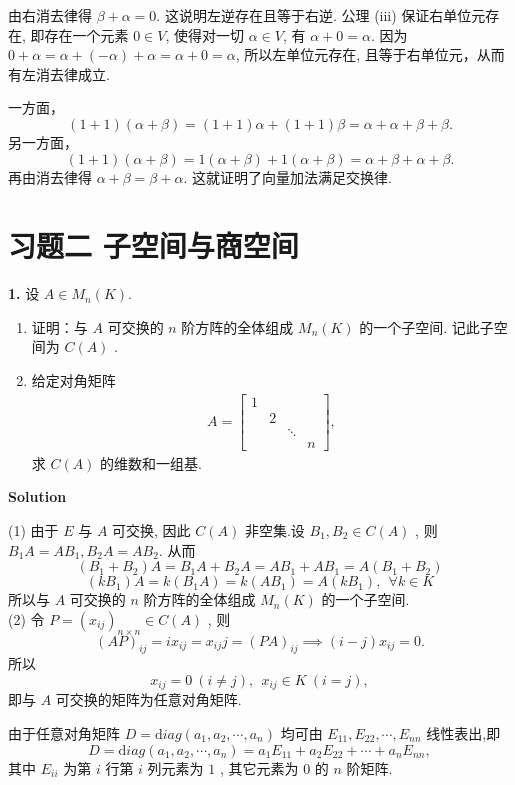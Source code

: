 \documentclass[11pt,a4paper,openany,oneside]{book}
\newcommand{\diag}{\mathrm diag}
\newcommand\Solution{\noindent\textbf{\textsf{Solution}}\par\medskip}
\begin{document}
由右消去律得 $\beta+\alpha=0$. 这说明左逆存在且等于右逆.
公理 (iii) 保证右单位元存在, 即存在一个元素 $0\in V$, 使得对一切
$\alpha\in V$, 有 $\alpha+0=\alpha$. 因为 $0+\alpha=\alpha+(-\alpha)+\alpha=\alpha+0=\alpha$, 所以左单位元存在, 且等于右单位元，从而有左消去律成立.



一方面，
$$
(1+1)(\alpha+\beta)=(1+1)\alpha+(1+1)\beta=\alpha+\alpha+\beta+\beta.
$$
另一方面，
$$
(1+1)(\alpha+\beta)=1(\alpha+\beta)+1(\alpha+\beta)=\alpha+\beta+\alpha+\beta.
$$
再由消去律得 $\alpha+\beta=\beta+\alpha$. 这就证明了向量加法满足交换律.



\section{习题二 \quad 子空间与商空间}

\begin{myexample}
	\textbf{1.} 
设 $ A \in M_n(K) $.
\begin{enumerate}[(1)]
\item 证明：与 $ A $ 可交换的 $ n $ 阶方阵的全体组成 $ M_n(K) $ 的一个子空间. 记此子空间为 $ C(A) $ . 
\item 给定对角矩阵 
\begin{gather*}
A=
\begin{bmatrix} 
1 &    &   &   \\ 
& 2  &   &   \\
&    & \ddots & \\
&    &    &  n  
\end{bmatrix},
\end{gather*}
求 $ C(A) $ 的维数和一组基. 
\end{enumerate}
\end{myexample}
\Solution

(1) 由于 $ E $ 与 $ A $ 可交换, 因此 $ C(A) $ 非空集.设 $ B_1, B_2 \in C(A) $ , 则 $ B_1A = AB_1, B_2A = AB_2 $. 从而
 $$  (B_1+B_2)A = B_1A + B_2A = AB_1 + AB_1 = A(B_1 + B_2)  $$ 
 $$  (kB_1)A = k(B_1A) = k(AB_1) = A(kB_1), \ \ \forall k \in K  $$ 
所以与 $ A $ 可交换的 $ n $ 阶方阵的全体组成 $ M_n(K) $ 的一个子空间. \\

(2) 令 $  P = (x_{ij})_{n \times n} \in C(A) $ , 则
\[  
(AP)_{ij} = ix_{ij} = x_{ij}j = (PA)_{ij} \implies (i-j)x_{ij} = 0. 
\]
所以
 $$  x_{ij} = 0 \ (i \neq j), \ \ x_{ij} \in K \ (i = j),  $$ 
即与 $ A $ 可交换的矩阵为任意对角矩阵.

由于任意对角矩阵 $ D = \diag(a_1, a_2, \cdots, a_n) $ 均可由 $ E_{11},E_{22}, \cdots, E_{nn} $ 线性表出,即
 $$  D = \diag(a_1, a_2, \cdots, a_n)= a_1E_{11} + a_2E_{22} + \cdots + a_nE_{nn},  $$ 
其中 $ E_{ii} $ 为第 $i$ 行第 $i$ 列元素为 $ 1 $ , 其它元素为 $ 0 $ 的 $ n $ 阶矩阵.
\end{document}
